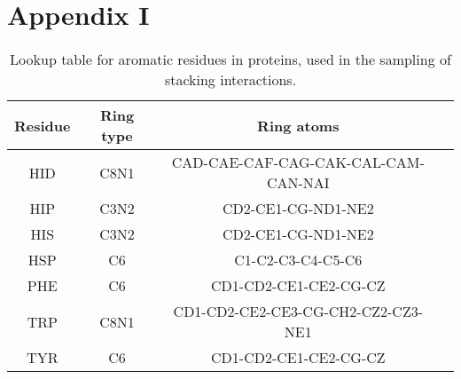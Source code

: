 \chapter*{Appendix I}

\begin{table}[H]
  \caption{\label{tab:appx1/aromatic_prot} Lookup table for aromatic residues in proteins, used in the sampling of stacking interactions.}
  \centering
  \begin{tabular}{cccc}
    \hline
    Residue & Ring type  & Ring atoms                          \\ \hline
    HID     & C8N1       & CAD-CAE-CAF-CAG-CAK-CAL-CAM-CAN-NAI \\
    HIP     & C3N2       & CD2-CE1-CG-ND1-NE2                  \\
    HIS     & C3N2       & CD2-CE1-CG-ND1-NE2                  \\
    HSP     & C6         & C1-C2-C3-C4-C5-C6                   \\
    PHE     & C6         & CD1-CD2-CE1-CE2-CG-CZ               \\
    TRP     & C8N1       & CD1-CD2-CE2-CE3-CG-CH2-CZ2-CZ3-NE1  \\
    TYR     & C6         & CD1-CD2-CE1-CE2-CG-CZ               \\ \hline
  \end{tabular}
\end{table}

